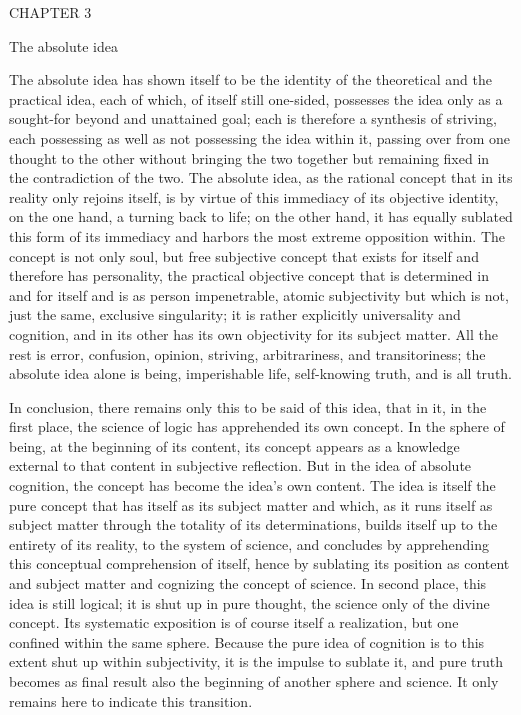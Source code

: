 CHAPTER 3

The absolute idea

The absolute idea has shown itself to be
the identity of the theoretical and the practical idea,
each of which, of itself still one-sided, possesses the idea
only as a sought-for beyond and unattained goal;
each is therefore a synthesis of striving,
each possessing as well as not possessing the idea within it,
passing over from one thought to the other
without bringing the two together
but remaining fixed in the contradiction of the two.
The absolute idea, as the rational concept
that in its reality only rejoins itself,
is by virtue of this immediacy of its objective identity,
on the one hand, a turning back to life;
on the other hand, it has equally
sublated this form of its immediacy
and harbors the most extreme opposition within.
The concept is not only soul,
but free subjective concept
that exists for itself
and therefore has personality,
the practical objective concept
that is determined in and for itself
and is as person impenetrable, atomic subjectivity
but which is not, just the same, exclusive singularity;
it is rather explicitly universality and cognition,
and in its other has its own objectivity for its subject matter.
All the rest is error, confusion, opinion,
striving, arbitrariness, and transitoriness;
the absolute idea alone is being, imperishable life,
self-knowing truth, and is all truth.

In conclusion, there remains only this to be said of this idea,
that in it, in the first place,
the science of logic has apprehended its own concept.
In the sphere of being, at the beginning of its content,
its concept appears as a knowledge external to
that content in subjective reflection.
But in the idea of absolute cognition,
the concept has become the idea's own content.
The idea is itself the pure concept
that has itself as its subject matter
and which, as it runs itself as subject matter
through the totality of its determinations,
builds itself up to the entirety of its reality,
to the system of science,
and concludes by apprehending this
conceptual comprehension of itself,
hence by sublating its position
as content and subject matter
and cognizing the concept of science.
In second place, this idea is still logical;
it is shut up in pure thought,
the science only of the divine concept.
Its systematic exposition is of course itself a realization,
but one confined within the same sphere.
Because the pure idea of cognition is
to this extent shut up within subjectivity,
it is the impulse to sublate it,
and pure truth becomes as final result
also the beginning of another sphere and science.
It only remains here to indicate this transition.

